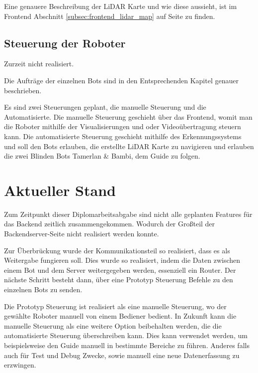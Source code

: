Eine genauere Beschreibung der LiDAR Karte und wie diese aussieht, 
ist im Frontend Abschnitt \ref{subsec:frontend_lidar_map} 
auf Seite \pageref{subsec:frontend_lidar_map} zu finden.

\subsection{Steuerung der Roboter}
\label{subsec:backend_robot_detection}
Zurzeit nicht realisiert.

Die Aufträge der einzelnen Bots sind in den Entsprechenden Kapitel genauer beschrieben.

Es sind zwei Steuerungen geplant, 
die manuelle Steuerung und die Automatisierte.
% 
Die manuelle Steuerung geschieht über das Frontend, 
womit man die Roboter mithilfe der Visualisierungen 
und oder Videoübertragung steuern kann.
% 
Die automatisierte Steuerung geschieht mithilfe des Erkennungssystems 
und soll den Bots erlauben, die erstellte LiDAR Karte zu navigieren 
und erlauben die zwei Blinden Bots Tamerlan \& Bambi, dem Guide zu folgen.

\section{Aktueller Stand}
\label{subsec:backend_aktueller_stand}
Zum Zeitpunkt dieser Diplomarbeitsabgabe 
sind nicht alle geplanten Features für das Backend zeitlich zusammengekommen.
Wodurch der Großteil der Backendserver-Seite nicht realisiert werden konnte.

Zur Überbrückung wurde der Kommunikationsteil so realisiert, 
dass es als Weitergabe fungieren soll.
Dies wurde so realisiert, indem die Daten 
zwischen einem Bot und dem Server weitergegeben werden, essenziell ein Router. 
Der nächste Schritt besteht dann, über eine Prototyp Steuerung 
Befehle zu den einzelnen Bots zu senden.

Die Prototyp Steuerung ist realisiert als eine manuelle Steuerung, 
wo der gewählte Roboter manuell von einem Bediener bedient.
In Zukunft kann die manuelle Steuerung als eine weitere Option beibehalten werden, 
die die automatisierte Steuerung überschreiben kann. 
Dies kann verwendet werden, 
um beispielsweise den Guide manuell in bestimmte Bereiche zu führen.
Anderes falls auch für Test und Debug Zwecke, 
sowie manuell eine neue Datenerfassung zu erzwingen.

